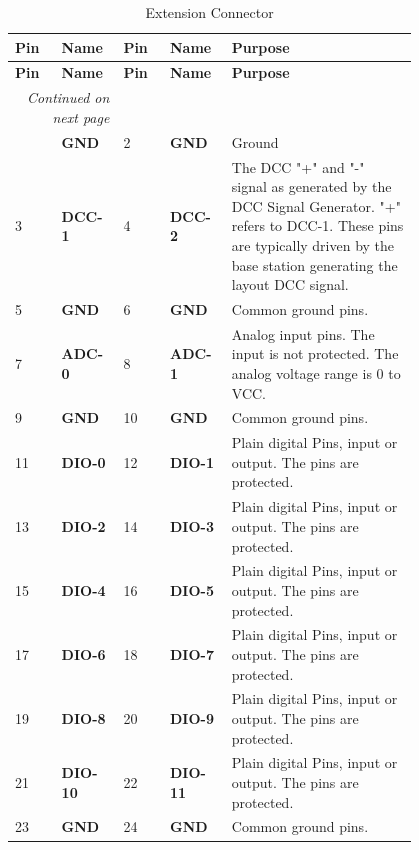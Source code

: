 \begin{longtable}{@{}|p{0.1\linewidth}|p{0.1\linewidth}|p{0.1\linewidth}|p{0.1\linewidth}|p{0.4\linewidth}|@{}}
    \caption{Extension Connector} \\
    \toprule
    \textbf{Pin} & \textbf{Name} & \textbf{Pin} & \textbf{Name} & \textbf{Purpose} \\
    \midrule
    \endfirsthead
    \toprule
    \textbf{Pin} & \textbf{Name} & \textbf{Pin} & \textbf{Name} & \textbf{Purpose} \\
    \midrule
    \endhead
    \midrule
    \multicolumn{2}{r}{\textit{Continued on next page}} \\
    \midrule
    \endfoot
    \bottomrule
    \endlastfoot
    1 & \textbf{GND} & 2 & \textbf{GND} & Ground \\
    \midrule
    3 & \textbf{DCC-1} & 4 & \textbf{DCC-2} & The DCC "+" and "-" signal as generated by the DCC Signal Generator. "+" refers to DCC-1. These pins are typically driven by the base station generating the layout DCC signal.\\
    \midrule
    5 & \textbf{GND} & 6 & \textbf{GND} & Common ground pins. \\
    \midrule
    7 & \textbf{ADC-0} & 8 & \textbf{ADC-1} & Analog input pins. The input is not protected. The analog voltage range is 0 to VCC. \\
    \midrule
    9 & \textbf{GND} & 10 & \textbf{GND} & Common ground pins. \\
    \midrule
    11 & \textbf{DIO-0} & 12 & \textbf{DIO-1} & Plain digital Pins, input or output. The pins are protected. \\
    \midrule
    13 & \textbf{DIO-2} & 14 & \textbf{DIO-3} & Plain digital Pins, input or output. The pins are protected. \\
    \midrule
    15 & \textbf{DIO-4} & 16 & \textbf{DIO-5} & Plain digital Pins, input or output. The pins are protected. \\
    \midrule
    17 & \textbf{DIO-6} & 18 & \textbf{DIO-7} & Plain digital Pins, input or output. The pins are protected. \\
    \midrule
    19 & \textbf{DIO-8} & 20 & \textbf{DIO-9} & Plain digital Pins, input or output. The pins are protected. \\
    \midrule
    21 & \textbf{DIO-10} & 22 & \textbf{DIO-11} & Plain digital Pins, input or output. The pins are protected. \\
    \midrule
    23 & \textbf{GND} & 24 & \textbf{GND} & Common ground pins. \\

\end{longtable}
